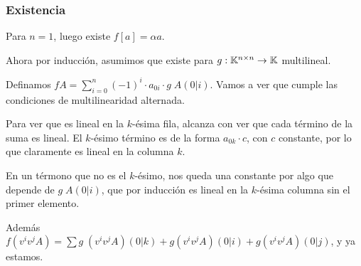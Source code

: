 \documentclass{article}
\begin{document}
\subsubsection*{Existencia}
Para $n=1$, luego existe $f[a] = \alpha a$.

Ahora por inducción, asumimos que existe para $g : \mathbb{K}^{n \times n} \to \mathbb{K}$ multilineal.

Definamos $f A = \sum_{i = 0}^n (-1)^i \cdot a_{0i}\cdot g \; A(0|i)$. Vamos a ver que cumple las condiciones de multilinearidad alternada.

Para ver que es lineal en la $k$-ésima fila, alcanza con ver que cada término de la suma es lineal. El $k$-ésimo término es de la forma $a_{0k} \cdot c$, con $c$ constante, por lo que claramente es lineal en la columna $k$.

En un térmono que no es el $k$-ésimo, nos queda una constante por algo que depende de $g \; A(0|i)$, que por inducción es lineal en la $k$-ésima columna sin el primer elemento.

Además $f (v^iv^jA) = \sum g \; (v^iv^jA)(0|k) + g (v^iv^jA)(0|i) + g(v^iv^jA)(0|j)$, y ya estamos.
\end{document}
